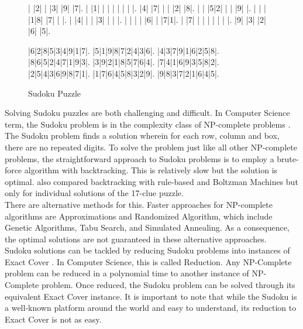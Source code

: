\documentclass[a4paper,oneside,11pt]{report}
\begin{document}
\begin{figure}[H]
\begin{center}
\begin{sudoku-block}
| |2| | |3| |9| |7|.
| |1| | | | | | | |.
|4| |7| | | |2| |8|.
| | |5|2| | | |9| |.
| | | |1|8| |7| | |.
| |4| | | |3| | | |.
| | | | |6| | |7|1|.
| |7| | | | | | | |.
|9| |3| |2| |6| |5|.
\end{sudoku-block}
\hspace{2cm}
\begin{sudoku-block}
|6|2|8|5|3|4|9|1|7|.
|5|1|9|8|7|2|4|3|6|.
|4|3|7|9|1|6|2|5|8|.
|8|6|5|2|4|7|1|9|3|.
|3|9|2|1|8|5|7|6|4|.
|7|4|1|6|9|3|5|8|2|.
|2|5|4|3|6|9|8|7|1|.
|1|7|6|4|5|8|3|2|9|.
|9|8|3|7|2|1|6|4|5|.
\end{sudoku-block}
\end{center}
\caption{Sudoku Puzzle}
\end{figure}

Solving Sudoku puzzles are both challenging and difficult. In Computer Science term, the Sudoku problem is in the complexity class of NP-complete problems \cite{Yato}. The Sudoku problem finds a solution wherein for each row, column and box, there are no repeated digits. To solve the problem just like all other NP-complete problems, the straightforward approach to Sudoku problems is to employ a brute-force algorithm with backtracking. This is relatively slow but the solution is optimal. \cite{Berggren} also compared backtracking with rule-based and Boltzman Machines but only for individual solutions of the 17-clue puzzle.\\

There are alternative methods for this. Faster approaches for NP-complete algorithms are Approximations and Randomized Algorithm, which include Genetic Algorithms, Tabu Search, and Simulated Annealing. As a consequence, the optimal solutions are not guaranteed in these alternative approaches.\\

Sudoku solutions can be tackled by reducing Sudoku problems into instances of Exact Cover \cite{Harrysson}. In Computer Science, this is called Reduction. Any NP-Complete problem can be reduced in a polynomial time to another instance of NP-Complete problem. Once reduced, the Sudoku problem can be solved through its equivalent Exact Cover instance. It is important to note that while the Sudoku is a well-known platform around the world and easy to understand, its reduction to Exact Cover is not as easy.\\
\end{document}
